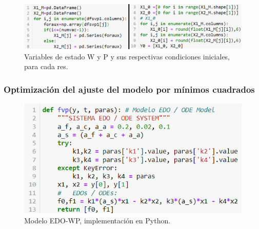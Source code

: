 \begin{enumerate}
        \begin{figure}[H]
            \centering
            \includegraphics[scale = 0.56]{img/x1x2einit.png}
            \caption{Variables de estado W y P y sus respectivas condiciones iniciales, para cada res.}
            \label{x1x2einitpng}
        \end{figure}
\end{enumerate}

\subsubsection{Optimización del ajuste del modelo por mínimos cuadrados} \label{optimizodeint}

        \begin{figure}[H]
            \centering
            \includegraphics[scale=0.7]{img/modEDOpython.png}
            \caption{Modelo EDO-WP, implementación en Python.}
            \label{modEDOpythonpng}
        \end{figure}

